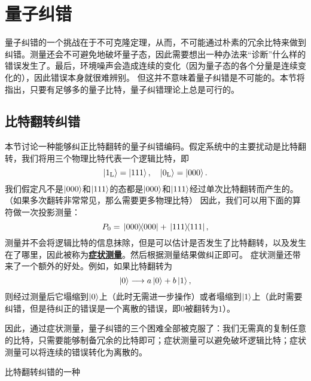 \documentclass[hyperref, UTF8, a4paper]{ctexart}
\newcommand*{\concept}[1]{\underline{\textbf{#1}}}
\begin{document}

\section{量子纠错}

量子纠错的一个挑战在于不可克隆定理，从而，不可能通过朴素的冗余比特来做到纠错。测量还会不可避免地破坏量子态，因此需要想出一种办法来“诊断”什么样的错误发生了。最后，环境噪声会造成连续的变化（因为量子态的各个分量是连续变化的），因此错误本身就很难辨别。
但这并不意味着量子纠错是不可能的。本节将指出，只要有足够多的量子比特，量子纠错理论上总是可行的。

\subsection{比特翻转纠错}

本节讨论一种能够纠正比特翻转的量子纠错编码。假定系统中的主要扰动是比特翻转，我们将用三个物理比特代表一个逻辑比特，即
\begin{equation}
    \ket{1_\text{L}} = \ket{111}, \quad \ket{0_\text{L}} = \ket{000}.
\end{equation}
我们假定凡不是$\ket{000}$和$\ket{111}$的态都是$\ket{000}$和$\ket{111}$经过单次比特翻转而产生的。（如果多次翻转非常常见，那么需要更多物理比特）
因此，我们可以用下面的算符做一次投影测量：
\begin{equation}
    P_0 = \dyad*{000} + \dyad*{111}, %
\end{equation}
测量并不会将逻辑比特的信息抹除，但是可以估计是否发生了比特翻转，以及发生在了哪里，因此被称为\concept{症状测量}。然后根据测量结果做纠正即可。
症状测量还带来了一个额外的好处。例如，如果比特翻转为
\[
    \ket{0} \longrightarrow a \ket{0} + b \ket{1},
\]
则经过测量后它塌缩到$\ket{0}$上（此时无需进一步操作）或者塌缩到$\ket{1}$上（此时需要纠错，但是待纠正的错误是一个离散的错误，即$0$被翻转为$1$）。

因此，通过症状测量，量子纠错的三个困难全部被克服了：我们无需真的复制任意的比特，只需要能够制备冗余的比特即可；症状测量可以避免破坏逻辑比特；症状测量可以将连续的错误转化为离散的。

比特翻转纠错的一种
\end{document}
